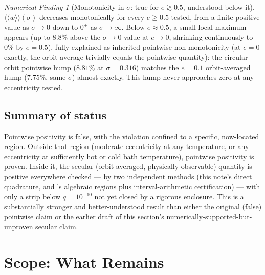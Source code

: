 \documentclass[12pt]{amsart}
\theoremstyle{plain}
\theoremstyle{remark}
\newtheorem*{finding}{Numerical Finding}
\begin{document}
\begin{finding}[Monotonicity in $\sigma$: true for $e\gtrsim0.5$, understood below it]\label{find:sigmamono}
$\langle\langle\dot w\rangle\rangle(\sigma)$ decreases monotonically for every $e\geq0.5$ tested, from a finite positive value as $\sigma\to0$ down to $0^+$ as $\sigma\to\infty$. Below $e\approx0.5$, a small local maximum appears (up to $8.8\%$ above the $\sigma\to0$ value at $e\to0$, shrinking continuously to $0\%$ by $e=0.5$), fully explained as inherited pointwise non-monotonicity (at $e=0$ exactly, the orbit average trivially equals the pointwise quantity): the circular-orbit pointwise hump ($8.81\%$ at $\sigma=0.316$) matches the $e=0.1$ orbit-averaged hump ($7.75\%$, same $\sigma$) almost exactly. This hump never approaches zero at any eccentricity tested.
\end{finding}

\subsection{Summary of status}

Pointwise positivity is false, with the violation confined to a specific, now-located region. Outside that region (moderate eccentricity at any temperature, or any eccentricity at sufficiently hot or cold bath temperature), pointwise positivity is proven. Inside it, the secular (orbit-averaged, physically observable) quantity is positive everywhere checked --- by two independent methods (this note's direct quadrature, and \cite{EbertAuditedSecular2026}'s algebraic regions plus interval-arithmetic certification) --- with only a strip below $q=10^{-10}$ not yet closed by a rigorous enclosure. This is a substantially stronger and better-understood result than either the original (false) pointwise claim or the earlier draft of this section's numerically-supported-but-unproven secular claim.

\section{Scope: What Remains}
\end{document}
